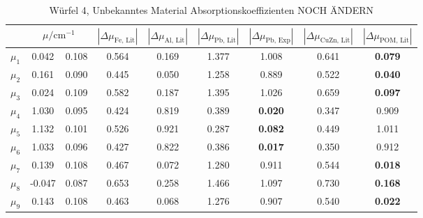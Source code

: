 \FloatBarrier
\noindent
\FloatBarrier
\begin{table}[h]
    \centering
    \caption{Würfel 4, Unbekanntes Material Absorptionskoeffizienten NOCH ÄNDERN}
    \label{tab:W4_Abk}
    \begin{tabular}{c S[table-format=1.3]@{${}\pm{}$} S[table-format=1.3] S[table-format=1.3] S[table-format=1.3] S[table-format=1.3] S[table-format=1.3] S[table-format=1.3] S[table-format=1.3]}
        \toprule
        {} &  & {$|\Delta {\mu_\text{Fe, Lit}}|$} & {$|\Delta {\mu_\text{Al, Lit}}|$} & {$|\Delta {\mu_\text{Pb, Lit}}|$} & {$|\Delta {\mu_\text{Pb, Exp}}|$} & {$|\Delta {\mu_\text{CuZn, Lit}}|$} & {$|\Delta {\mu_\text{POM, Lit}}|$} \\
        \midrule
        $\mu_1$ & 0.042  & 0.108 & 0.564 & 0.169 & 1.377 & 1.008 & 0.641 & \textbf{0.079} \\
        $\mu_2$ & 0.161  & 0.090 & 0.445 & 0.050 & 1.258 & 0.889 & 0.522 & \textbf{0.040} \\
        $\mu_3$ & 0.024  & 0.109 & 0.582 & 0.187 & 1.395 & 1.026 & 0.659 & \textbf{0.097} \\
        $\mu_4$ & 1.030  & 0.095 & 0.424 & 0.819 & 0.389 & \textbf{0.020} & 0.347 & 0.909 \\
        $\mu_5$ & 1.132  & 0.101 & 0.526 & 0.921 & 0.287 & \textbf{0.082} & 0.449 & 1.011 \\
        $\mu_6$ & 1.033  & 0.096 & 0.427 & 0.822 & 0.386 & \textbf{0.017} & 0.350 & 0.912 \\
        $\mu_7$ & 0.139  & 0.108 & 0.467 & 0.072 & 1.280 & 0.911 & 0.544 & \textbf{0.018} \\
        $\mu_8$ & -0.047 & 0.087 & 0.653 & 0.258 & 1.466 & 1.097 & 0.730 & \textbf{0.168} \\
        $\mu_9$ & 0.143  & 0.108 & 0.463 & 0.068 & 1.276 & 0.907 & 0.540 & \textbf{0.022} \\
        \bottomrule
    \end{tabular}
\end{table}
\FloatBarrier
\noindent

\begin{figure}
    \centering
    \caption{}
    \label{fig:tikz2}
\end{figure}

